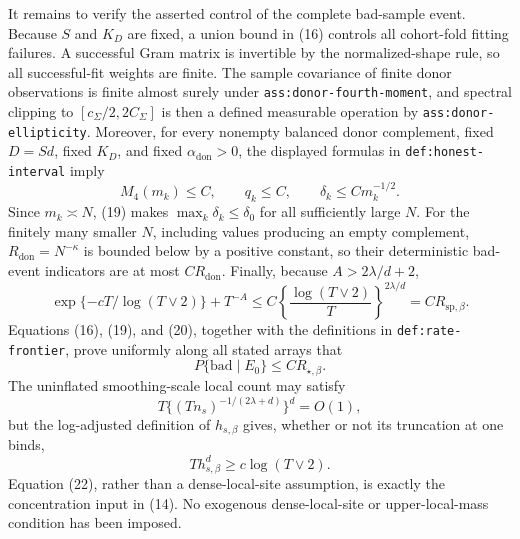 It remains to verify the asserted control of the complete bad-sample event.  Because \(S\) and \(K_D\) are fixed, a union bound in (16) controls all cohort-fold fitting failures.  A successful Gram matrix is invertible by the normalized-shape rule, so all successful-fit weights are finite.  The sample covariance of finite donor observations is finite almost surely under \texttt{ass:donor-fourth-moment}, and spectral clipping to \([c_\Sigma/2,2C_\Sigma]\) is then a defined measurable operation by \texttt{ass:donor-ellipticity}.  Moreover, for every nonempty balanced donor complement, fixed \(D=Sd\), fixed \(K_D\), and fixed \(\alpha_{\mathrm{don}}>0\), the displayed formulas in \texttt{def:honest-interval} imply
\[
 M_4(m_k)\le C,
 \qquad q_k\le C,
 \qquad \delta_k\le Cm_k^{-1/2}.
\tag{19}
\]
Since \(m_k\asymp N\), (19) makes \(\max_k\delta_k\le\delta_0\) for all sufficiently large \(N\).  For the finitely many smaller \(N\), including values producing an empty complement, \(R_{\mathrm{don}}=N^{-\kappa}\) is bounded below by a positive constant, so their deterministic bad-event indicators are at most \(CR_{\mathrm{don}}\).  Finally, because \(A>2\lambda/d+2\),
\[
 \exp\{-cT/\log(T\vee2)\}+T^{-A}
 \le C\left\{\frac{\log(T\vee2)}T\right\}^{2\lambda/d}
 =CR_{\mathrm{sp},\beta}.
\tag{20}
\]
Equations (16), (19), and (20), together with the definitions in \texttt{def:rate-frontier}, prove uniformly along all stated arrays that
\[
 P\{\mathrm{bad}\mid E_0\}\le CR_{\star,\beta}.
\tag{21}
\]
The uninflated smoothing-scale local count may satisfy
\[
 T\{(Tn_s)^{-1/(2\lambda+d)}\}^d=O(1),
\]
but the log-adjusted definition of \(h_{s,\beta}\) gives, whether or not its truncation at one binds,
\[
 Th_{s,\beta}^d\ge c\log(T\vee2).
\tag{22}
\]
Equation (22), rather than a dense-local-site assumption, is exactly the concentration input in (14).  No exogenous dense-local-site or upper-local-mass condition has been imposed.
